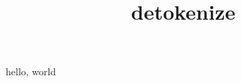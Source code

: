 \documentclass{amsart}
\title{detokenize}
\begin{document}
\maketitle

hello, world

\texttt{}

\texttt{\detokenize{\fafkl {} $_&^}}

\edef\X{\detokenize{\fafkl {} $_&^}}

{\tt\meaning\X}
\end{document}
